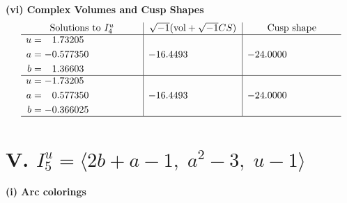\documentclass[1p]{elsarticle_modified}
\theoremstyle{definition}
\newcommand{\I}{\sqrt{-1}}
\begin{document}
\newpage\flushleft \textbf{(vi) Complex Volumes and Cusp Shapes}
$$\begin{array}{c|c|c}  
\text{Solutions to }I^u_{4}& \I (\text{vol} + \sqrt{-1}CS) & \text{Cusp shape}\\
 \hline 
\begin{aligned}
u &= \phantom{-}1.73205\phantom{ +0.000000I} \\
a &= -0.577350\phantom{ +0.000000I} \\
b &= \phantom{-}1.36603\phantom{ +0.000000I}\end{aligned}
 & -16.4493\phantom{ +0.000000I} & -24.0000\phantom{ +0.000000I} \\ \hline\begin{aligned}
u &= -1.73205\phantom{ +0.000000I} \\
a &= \phantom{-}0.577350\phantom{ +0.000000I} \\
b &= -0.366025\phantom{ +0.000000I}\end{aligned}
 & -16.4493\phantom{ +0.000000I} & -24.0000\phantom{ +0.000000I}\\
 \hline 
 \end{array}$$\newpage\newpage\renewcommand{\arraystretch}{1}
\centering \section*{V. $I^u_{5}= \langle 2 b+a-1,\;a^2-3,\;u-1 \rangle$}
\flushleft \textbf{(i) Arc colorings}\\
\end{document}

